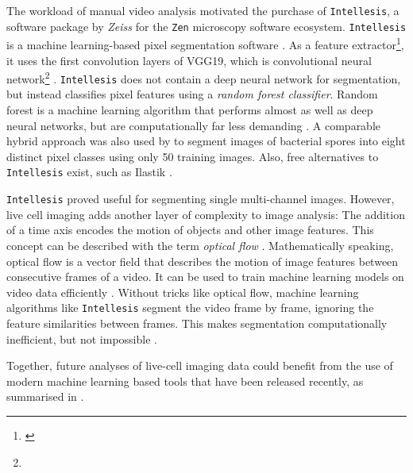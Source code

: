 The workload of manual video analysis motivated the purchase of
\texttt{Intellesis}, a software package by \textit{Zeiss} for the \texttt{Zen}
microscopy software ecosystem. \texttt{Intellesis} is a machine learning-based
pixel segmentation software \cite{ZeissOADFeature}. As a feature
extractor\footnote{\label{foot:image_features}\imagefeatures}, it uses the first
convolution layers of VGG19, which is convolutional neural
network\footnote{\cnn} \cite{simonyanVeryDeepConvolutional2015}.
\texttt{Intellesis} does not contain a deep neural network for segmentation, but
instead classifies pixel features using a \emph{random forest classifier}.
Random forest is a machine learning algorithm that  performs almost as well as deep neural networks, but
are computationally far less demanding \cite{breimanRandomForests2001,
    richardsonDenseNeuralNetwork2023}. A comparable hybrid approach was also used by
\citet{qamarHybridCNNRandomForest2023} to segment images of bacterial spores
into eight distinct pixel classes using only 50 training images. Also, free
alternatives to \texttt{Intellesis} exist, such as Ilastik
\cite{bergIlastikInteractiveMachine2019}.

\texttt{Intellesis} proved useful for segmenting single multi-channel images.
However, live cell imaging adds another layer of complexity to image analysis:
The addition of a time axis encodes the motion of objects and other image
features. This concept can be described with the term \emph{optical flow}
\cite{niehorsterOpticFlowHistory2021}. Mathematically speaking, optical flow is
a vector field that describes the motion of image
features between consecutive frames of a video. It
can be used to train machine learning models on video data efficiently
\cite{robitailleSelfsupervisedMachineLearning2022}. Without tricks like optical
flow, machine learning algorithms like \texttt{Intellesis} segment the video
frame by frame, ignoring the feature similarities between frames. This makes
segmentation computationally inefficient, but not impossible
\cite{pylvanainenLivecellImagingDeep2023}.

Together, future analyses of live-cell imaging data could  benefit
from the use of modern machine learning based tools that have been released
recently, as summarised in \citet{pylvanainenLivecellImagingDeep2023}.



